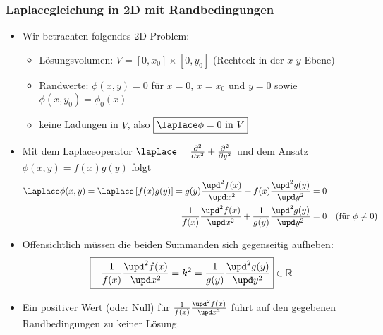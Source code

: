   \begin{frame}
    \frametitle{Laplacegleichung in 2D mit Randbedingungen}
      \vspace*{-3mm}
      
    \begin{itemize}[<+->]
    \item Wir betrachten folgendes 2D Problem:
    \begin{itemize}[<+->]
     \item Lösungsvolumen: $ V = [0,x_0] \times [0,y_0]$ (Rechteck in der $x$-$y$-Ebene)
    \item Randwerte: $\phi(x,y) = 0$ für $x=0$, $x=x_0$ und $y=0$ sowie $\phi(x,y_0) = \phi_0(x)$
    \item keine Ladungen in $V$, also $\boxed{\laplace\phi = 0 \text{ in } V}$
    \end{itemize}
  \item Mit dem Laplaceoperator $\laplace = \frac{\partial^2}{\partial x^2} + \frac{\partial^2}{\partial y^2}$ und dem \alert{Ansatz} $\phi (x,y) = f(x)g(y)$
    folgt
    \begin{align*}
      \laplace\phi(x,y)   = \laplace\left[f(x)g(y)\right] = g(y)\frac{\upd^2 f(x)}{\upd x^2} + f(x)\frac{\upd^2 g(y)}{\upd y^2} &= 0\\
      \frac{1}{f(x)}\frac{\upd^2 f(x)}{\upd x^2} + \frac{1}{g(y)}\frac{\upd^2 g(y)}{\upd y^2} &= 0\quad (\text{für } \phi\neq 0)
    \end{align*}
  \item Offensichtlich müssen die beiden Summanden sich gegenseitig aufheben:
    $$
    \boxed{- \frac{1}{f(x)}\frac{\upd^2 f(x)}{\upd x^2}  = k^2 =  \frac{1}{g(y)}\frac{\upd^2 g(y)}{\upd y^2}} \in \mathbb{R}
    $$
    \item Ein positiver Wert (oder Null) für $\frac{1}{f(x)}\frac{\upd^2 f(x)}{\upd x^2}$ führt auf den gegebenen Randbedingungen zu keiner Lösung. 
      \end{itemize}
\end{frame}

